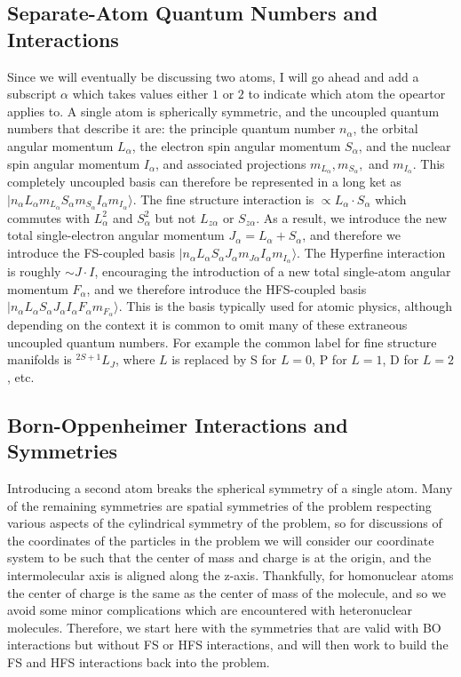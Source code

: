 \documentclass[prl, longbibliography]{revtex4-2}
\begin{document}
\subsection{Separate-Atom Quantum Numbers and Interactions}
Since we will eventually be discussing two atoms, I will go ahead and add a subscript $\alpha$ which takes values either $1$ or $2$ to indicate which atom the opeartor applies to.
A single atom is spherically symmetric, and the uncoupled quantum numbers that describe it are: the principle quantum number $n_\alpha$, the orbital angular momentum $L_\alpha$, the electron spin angular momentum $S_\alpha$, and the nuclear spin angular momentum $I_\alpha$, and associated projections $m_{L_\alpha}, m_{S_\alpha}, $ and $m_{I_\alpha}$. 
This completely uncoupled basis can therefore be represented in a long ket as $|n_\alpha L_\alpha m_{L_\alpha} S_\alpha m_{S_\alpha} I_\alpha m_{I_\alpha}\rangle$.
The fine structure interaction is $\propto L_\alpha\cdot S_\alpha$ which commutes with $L^2_\alpha$ and $S^2_\alpha$ but not $L_{z\alpha}$ or $S_{z\alpha}$.
As a result, we introduce the new total single-electron angular momentum $J_\alpha=L_\alpha+S_\alpha$, and therefore we introduce the FS-coupled basis $|n_\alpha L_\alpha S_\alpha J_\alpha m_{J\alpha} I_\alpha m_{I_\alpha}\rangle$.
The Hyperfine interaction is roughly $\sim J\cdot I$, encouraging the introduction of a new total single-atom angular momentum $F_\alpha$, and we therefore introduce the HFS-coupled basis $|n_\alpha L_\alpha S_\alpha J_\alpha I_\alpha F_\alpha m_{F_\alpha}\rangle$. 
This is the basis typically used for atomic physics, although depending on the context it is common to omit many of these extraneous uncoupled quantum numbers. 
For example the common label for fine structure manifolds is $^{2S+1}L_J$, where $L$ is replaced by S for $L=0$, P for $L=1$, D for $L=2$, etc.

\subsection{Born-Oppenheimer Interactions and Symmetries}
Introducing a second atom breaks the spherical symmetry of a single atom.
Many of the remaining symmetries are spatial symmetries of the problem respecting various aspects of the cylindrical symmetry of the problem, so for discussions of the coordinates of the particles in the problem we will consider our coordinate system to be such that the center of mass and charge is at the origin, and the intermolecular axis is aligned along the z-axis. 
Thankfully, for homonuclear atoms the center of charge is the same as the center of mass of the molecule, and so we avoid some minor complications which are encountered with heteronuclear molecules.
Therefore, we start here with the symmetries that are valid with BO interactions but without FS or HFS interactions, and will then work to build the FS and HFS interactions back into the problem.
\end{document}
